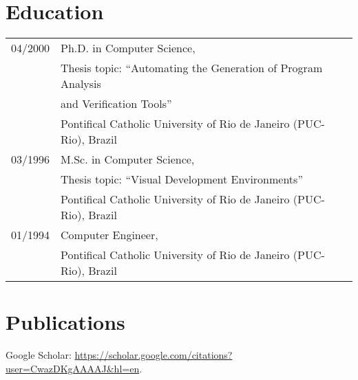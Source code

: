 \documentclass{article}
\begin{document}
\section*{Education}
\begin{tabular}{ll}
04/2000 & Ph.D. in Computer Science, \\
  & Thesis topic: ``Automating the Generation of Program Analysis \\
  & and Verification Tools'' \\
  & Pontifical Catholic University of Rio de Janeiro (PUC-Rio), Brazil \\
03/1996 & M.Sc. in Computer Science, \\
        & Thesis topic: ``Visual Development Environments'' \\
        & Pontifical Catholic University of Rio de Janeiro (PUC-Rio), Brazil \\
01/1994 & Computer Engineer, \\
        & Pontifical Catholic University of Rio de Janeiro (PUC-Rio), Brazil \\
\end{tabular}

\section*{Publications}

Google Scholar: \url{https://scholar.google.com/citations?user=CwazDKgAAAAJ&hl=en}.
\end{document}
